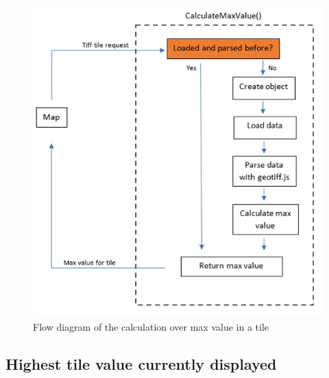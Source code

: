 \begin{figure} [H]
	\centering
	\includegraphics[width=.6\textwidth]{Pictures/CalculateMaxValue}
	\caption{Flow diagram of the calculation over max value in a tile}
	\label{CalculateMaxValue}
\end{figure}



\subsection{Highest tile value currently displayed}


